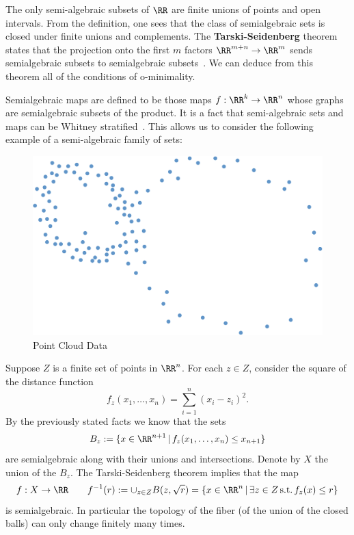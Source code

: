 	The only semi-algebraic subsets of $\RR$ are finite unions of points and open intervals. From the definition, one sees that the class of semialgebraic sets is closed under finite unions and complements. The \textbf{Tarski-Seidenberg} theorem states that the projection onto the first $m$ factors $\RR^{m+n}\to\RR^m$  sends semialgebraic subsets to semialgebraic subsets~\cite{coste-sag}. We can deduce from this theorem all of the conditions of o-minimality.
	
	Semialgebraic maps are defined to be those maps $f:\RR^k\to \RR^n$ whose graphs are semialgebraic subsets of the product. It is a fact that semi-algebraic sets and maps can be Whitney stratified~\cite{shiota-geometry}. This allows us to consider the following example of a semi-algebraic family of sets:
	
	\begin{figure}
		\centering
		\includegraphics[width=.9\textwidth]{point_cloud2.pdf}
		\caption{Point Cloud Data}
		\label{fig:point_cloud}
	\end{figure}

\begin{ex}\label{ex:pcd}
	Suppose $Z$ is a finite set of points in $\RR^n$. For each $z\in Z$, consider the square of the distance function
	\[f_z(x_1,\ldots,x_n)=\sum_{i=1}^n (x_i-z_i)^2.\]
	By the previously stated facts we know that the sets
	\[
		B_z:=\{x\in\RR^{n+1} \, | \, f_z(x_1,\ldots,x_n)\leq x_{n+1}\}
	\]
	are semialgebraic along with their unions and intersections. Denote by $X$ the union of the $B_z$. The Tarski-Seidenberg theorem implies that the map
	\[
		f:X\to\RR \qquad f^{-1}(r):=\cup_{z\in Z} B(z,\sqrt{r})=\{x\in\RR^n \, | \, \exists z\in Z \, \mathrm{s.t.} \, f_z(x)\leq r\}	\]
	is semialgebraic. In particular the topology of the fiber (of the union of the closed balls) can only change finitely many times.
\end{ex}

